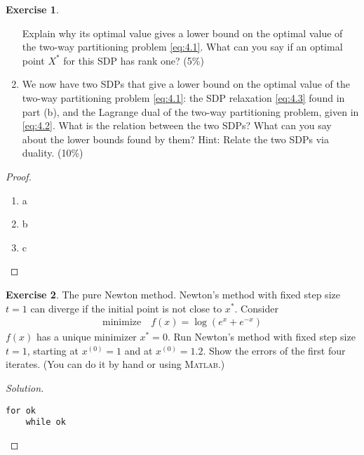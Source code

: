 \documentclass[12pt]{extarticle}
\theoremstyle{definition}
\newtheorem{exercise}{Exercise}
\begin{document}
\begin{exercise}
\begin{enumerate}[label=(\alph*)]
          Explain why its optimal value gives a lower bound on the optimal value of the two-way partitioning problem \eqref{eq:4.1}.
          What can you say if an optimal point $X^\ast$ for this SDP has rank one? (5\%)
    \item We now have two SDPs that give a lower bound on the optimal value of the two-way partitioning problem \eqref{eq:4.1}:
          the SDP relaxation \eqref{eq:4.3} found in part (b),
          and the Lagrange dual of the two-way partitioning problem, given in \eqref{eq:4.2}.
          What is the relation between the two SDPs?
          What can you say about the lower bounds found by them?
          Hint: Relate the two SDPs via duality. (10\%)
  \end{enumerate}
\end{exercise}
\begin{proof}
  $ $
  \begin{enumerate}[label=(\alph*)]
    \item a
    \item b
    \item c
  \end{enumerate}
\end{proof}

\begin{exercise}
  The pure Newton method.
  Newton's method with fixed step size $t=1$ can diverge if the initial point is not close to $x^\ast$.
  Consider
  \begin{align*}
    \text{minimize}\quad f(x)=\log(e^x+e^{-x})
  \end{align*}
  $f(x)$ has a unique minimizer $x^\ast=0$.
  Run Newton's method with fixed step size $t=1$, starting at $x^{(0)}=1$ and at $x^{(0)}=1.2$.
  Show the errors of the first four iterates.
  (You can do it by hand or using \textsc{Matlab}.)
\end{exercise}
\begin{proof}[Solution]
  \let\qed\relax
  $ $
  \begin{lstlisting}[style=Matlab-editor]
    for ok
    while ok
  \end{lstlisting}
\end{proof}
\end{document}
